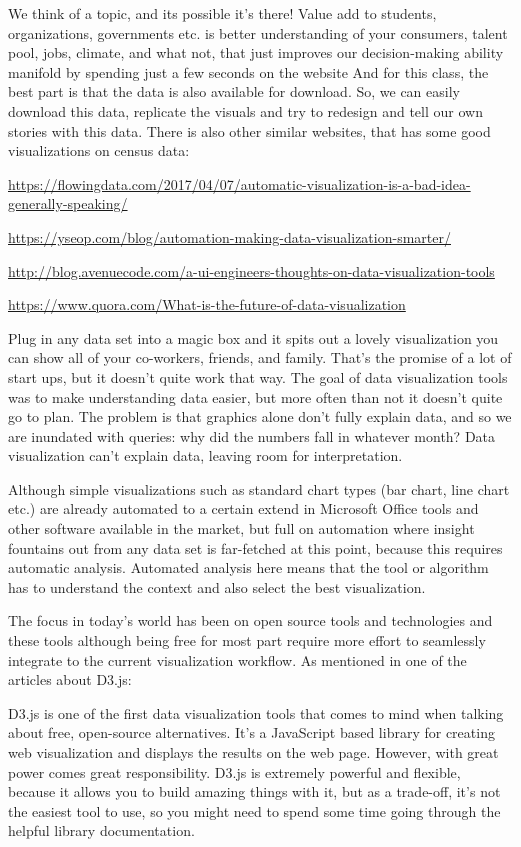 \documentclass[]{book}
\theoremstyle{definition}
\theoremstyle{definition}
\theoremstyle{definition}
\theoremstyle{remark}
\begin{document}
We think of a topic, and its possible it's there! Value add to students,
organizations, governments etc. is better understanding of your
consumers, talent pool, jobs, climate, and what not, that just improves
our decision-making ability manifold by spending just a few seconds on
the website And for this class, the best part is that the data is also
available for download. So, we can easily download this data, replicate
the visuals and try to redesign and tell our own stories with this data.
There is also other similar websites, that has some good visualizations
on census data: \citep{CensusDataViz}

\url{https://flowingdata.com/2017/04/07/automatic-visualization-is-a-bad-idea-generally-speaking/}

\url{https://yseop.com/blog/automation-making-data-visualization-smarter/}

\url{http://blog.avenuecode.com/a-ui-engineers-thoughts-on-data-visualization-tools}

\url{https://www.quora.com/What-is-the-future-of-data-visualization}

Plug in any data set into a magic box and it spits out a lovely
visualization you can show all of your co-workers, friends, and family.
That's the promise of a lot of start ups, but it doesn't quite work that
way. The goal of data visualization tools was to make understanding data
easier, but more often than not it doesn't quite go to plan. The problem
is that graphics alone don't fully explain data, and so we are inundated
with queries: why did the numbers fall in whatever month? Data
visualization can't explain data, leaving room for interpretation.

Although simple visualizations such as standard chart types (bar chart,
line chart etc.) are already automated to a certain extend in Microsoft
Office tools and other software available in the market, but full on
automation where insight fountains out from any data set is far-fetched
at this point, because this requires automatic analysis. Automated
analysis here means that the tool or algorithm has to understand the
context and also select the best visualization.

The focus in today's world has been on open source tools and
technologies and these tools although being free for most part require
more effort to seamlessly integrate to the current visualization
workflow. As mentioned in one of the articles about D3.js:

D3.js is one of the first data visualization tools that comes to mind
when talking about free, open-source alternatives. It's a JavaScript
based library for creating web visualization and displays the results on
the web page. However, with great power comes great responsibility.
D3.js is extremely powerful and flexible, because it allows you to build
amazing things with it, but as a trade-off, it's not the easiest tool to
use, so you might need to spend some time going through the helpful
library documentation.
\end{document}
